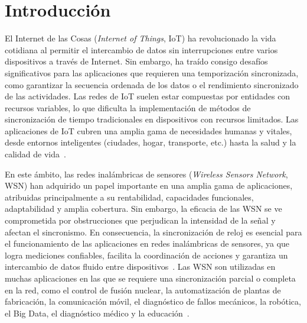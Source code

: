 
\chapter{Introducción}
\label{ch:introduccion}

El Internet de las Cosas (\textit{Internet of Things}, IoT) ha revolucionado la vida cotidiana al permitir el intercambio de datos sin interrupciones entre varios dispositivos a través de Internet. Sin embargo, ha traído consigo desafíos significativos para las aplicaciones que requieren una temporización sincronizada, como garantizar la secuencia ordenada de los datos o el rendimiento sincronizado de las actividades. Las redes de IoT suelen estar compuestas por entidades con recursos variables, lo que dificulta la implementación de métodos de sincronización de tiempo tradicionales en dispositivos con recursos limitados. Las aplicaciones de IoT cubren una amplia gama de necesidades humanas y vitales, desde entornos inteligentes (ciudades, hogar, transporte, etc.) hasta la salud y la calidad de vida~\cite{ayoub2019}.

En este ámbito, las redes inalámbricas de sensores (\textit{Wireless Sensors Network}, WSN) han adquirido un papel importante en una amplia gama de aplicaciones, atribuidas principalmente a su rentabilidad, capacidades funcionales, adaptabilidad y amplia cobertura. Sin embargo, la eficacia de las WSN se ve comprometida por obstrucciones que perjudican la intensidad de la señal y afectan el sincronismo. En consecuencia, la sincronización de reloj es esencial para el funcionamiento de las aplicaciones en redes inalámbricas de sensores, ya que logra mediciones confiables, facilita la coordinación de acciones y garantiza un intercambio de datos fluido entre dispositivos~\cite{yang2020,masalskyi2024}. Las WSN son utilizadas en muchas aplicaciones en las que se requiere una sincronización parcial o completa en la red, como el control de fusión nuclear, la automatización de plantas de fabricación, la comunicación móvil, el diagnóstico de fallos mecánicos, la robótica, el Big Data, el diagnóstico médico y la educación~\cite{balakrishnan2023,lasassmeh2010}.

